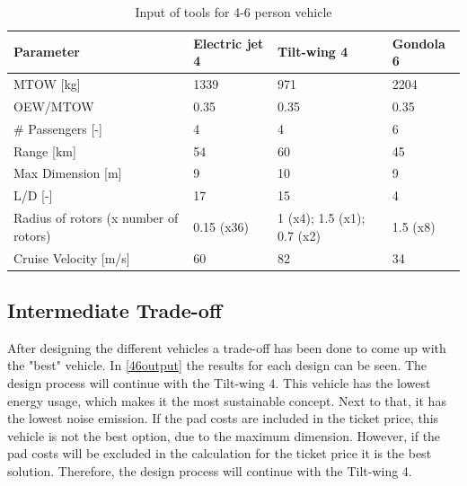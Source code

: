 \begin{table}[H]
\captionsetup{justification=centering}
\caption{Input of tools for 4-6 person vehicle}
\label{46input}
\begin{tabular}{@{}llll@{}}
\toprule
\textbf{Parameter}                       & \textbf{Electric jet 4} & \textbf{Tilt-wing 4} & \textbf{Gondola 6} \\ \midrule
MTOW {[}kg{]}                            & 1339                   & 971                   & 2204                    \\
OEW/MTOW           & 0.35                   & 0.35                   & 0.35                    \\
\# Passengers {[}-{]}                    & 4                   &  4                  & 6                   \\
Range {[}km{]}                           & 54                   &  60                  & 45                    \\
Max Dimension {[}m{]}                    & 9                   & 10                    & 9                   \\
L/D {[}-{]}                              & 17                   & 15                   & 4                    \\
Radius of rotors (x number of rotors)      & 0.15 (x36)           & 1 (x4); 1.5 (x1); 0.7 (x2) & 1.5 (x8)                    \\
Cruise Velocity {[}m/s{]}                & 60                   & 82                    & 34                    \\ \bottomrule
\end{tabular}

\end{table}


\subsection{Intermediate Trade-off}
After designing the different vehicles a trade-off has been done to come up with the "best" vehicle. In \autoref{46output} the results for each design can be seen. The design process will continue with the Tilt-wing 4. This vehicle has the lowest energy usage, which makes it the most sustainable concept. Next to that, it has the lowest noise emission. If the pad costs are included in the ticket price, this vehicle is not the best option, due to the maximum dimension. However, if the pad costs will be excluded in the calculation for the ticket price it is the best solution. Therefore, the design process will continue with the Tilt-wing 4.



